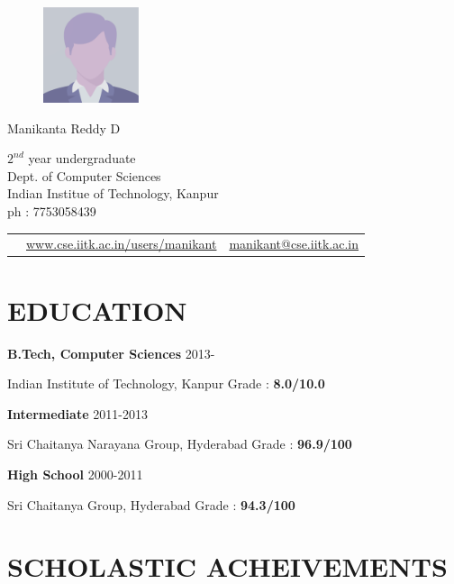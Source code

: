 \documentclass{article}
\newcommand{\sepspace}{\vspace*{0.8em}}
\newcommand{\MyName}[1]{
		\huge \usefont{OT1}{phv}{b}{n} \hfill #1 		
		\normalsize \normalfont
		}
\newcommand{\NewPart}[1]{\section*{\uppercase{#1}}}
\newcommand{\SkillsEntry}[3]{#1 & #2 & #3\\}
\newcommand{\EducationEntry}[4]{
		\noindent \textbf{#1} \hfill 	{#2} \par				
		\noindent #3 \hfill	
		Grade : \textbf{#4} 	
		}
\begin{document}
\begin{figure}
	\vspace*{-3em}
		\includegraphics[width=0.25\textwidth]{photo.eps}
\end{figure}

\MyName{Manikanta Reddy D}
\begin{flushright}
	$2^{nd}$ year undergraduate\\
	Dept. of Computer Sciences\\
	Indian Institue of Technology, Kanpur\\
	ph : 7753058439
	\begin{tabular}{m{}  m{} m{}}
	\SkillsEntry{}{\footnotesize{\url{www.cse.iitk.ac.in/users/manikant}}}{\href{mailto:manikant@cse.iitk.ac.in}{\footnotesize{\url{manikant@cse.iitk.ac.in}}}}
	\end{tabular}
\end{flushright}


\NewPart{Education}{}

\EducationEntry{B.Tech, Computer Sciences}{2013-}{Indian Institute of Technology, Kanpur}{8.0/10.0}

\sepspace

\EducationEntry{Intermediate}{2011-2013}{Sri Chaitanya Narayana Group, Hyderabad}{96.9/100}

\sepspace

\EducationEntry{High School}{2000-2011}{Sri Chaitanya Group, Hyderabad}{94.3/100}


\NewPart{Scholastic Acheivements}{}
\end{document}
